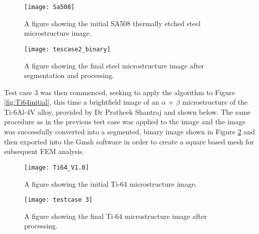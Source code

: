 \documentclass[\report.tex]{subfiles}
\begin{document}
\begin{figure}[!htb]
  \centering
  \begin{minipage}[!htb]{.5\textwidth}
    \centering\captionsetup{width=.8\linewidth}%
    \texttt{[image: Sa508]}
    \caption{A figure showing the initial SA508 thermally etched steel microstructure image.}\label{fig:SA508}
  \end{minipage}%
  \begin{minipage}[!htb]{.5\textwidth}
    \centering\captionsetup{width=.8\linewidth}%
    \texttt{[image: tescase2\_binary]}
    \caption{A figure showing the final steel microstructure image after segmentation and processing.}\label{fig:SA508_2}
  \end{minipage}
\end{figure}

\pagebreak

\noindent Test case 3 was then commenced, seeking to apply the algorithm to Figure \ref{fig:Ti64initial}, this time a brightfield image of an $\alpha$ + $\beta$ microstructure of the Ti-6Al-4V alloy, provided by Dr Pratheek Shantraj and shown below. The same procedure as in the previous test case was applied to the image and the image was successfully converted into a segmented, binary image shown in Figure \ref{fig:Ti64_2} and then exported into the Gmsh software in order to create a square based mesh for subsequent FEM analysis.\\

\begin{figure}[!htb]
  \centering
  \begin{minipage}[!htb]{.5\textwidth}
    \centering\captionsetup{width=.8\linewidth}%
    \texttt{[image: Ti64\_V1.0]}
    \caption{A figure showing the initial Ti-64 microstructure image.}\label{fig:Ti64initial}
  \end{minipage}%
  \begin{minipage}[!htb]{.5\textwidth}
    \centering\captionsetup{width=.8\linewidth}%
    \texttt{[image: testcase 3]}
    \caption{A figure showing the final Ti-64 microstructure image after processing.}\label{fig:Ti64_2}
  \end{minipage}
\end{figure}
\end{document}
